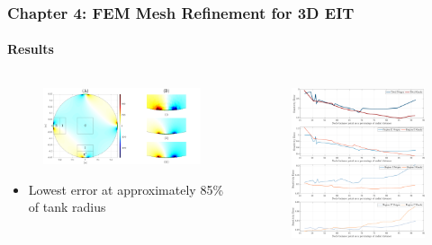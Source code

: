 \documentclass[10pt,    %
    english,            %
    xcolor=table,       %
    envcountsect,        %
    aspectratio=1610
]{beamer}
\begin{document}
\begin{frame}
	\frametitle{Chapter 4: FEM Mesh Refinement for 3D EIT}
	\framesubtitle{Results}
	\begin{columns}[c]
		\begin{column}{0.47\textwidth}
	\begin{figure}
		\centering
	\includegraphics[width=\textwidth,trim={0 0 15cm 1.2cm},clip]{roi_methods_figure.pdf}
	\end{figure}
	\begin{itemize}
		\item Lowest error at approximately 85\% of tank radius
	\end{itemize}
\end{column}
\begin{column}{0.53\textwidth}
	\begin{figure}
		\centering
		\vspace{-5mm}
	\includegraphics[width=\textwidth,trim={0 0 0cm 0cm},clip]{m-mesh_sens_error_regions_split.pdf}
	\end{figure}
\end{column}
\end{columns}

\end{frame}
\end{document}
